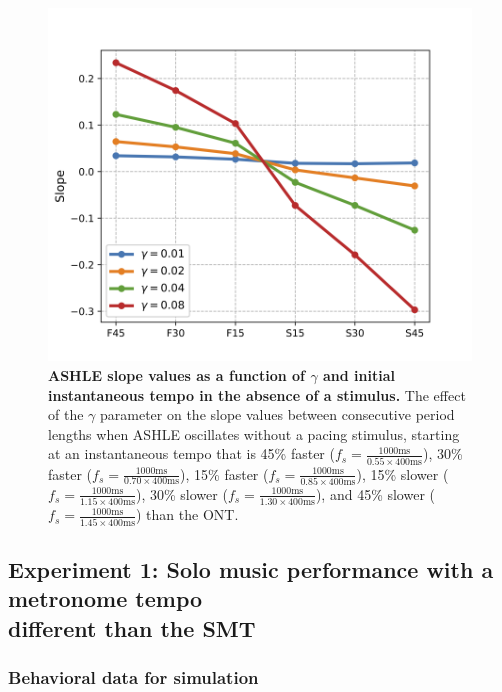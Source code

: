 \documentclass{report}
\begin{document}
\begin{figure}
    \centering
    \includegraphics[width=1.0\textwidth]{figures/fig3_8.png}
    \caption[ASHLE slope values as a function of $\gamma$ and initial instantaneous tempo in the absence of a stimulus]{\textbf{ASHLE slope values as a function of $\gamma$ and initial instantaneous tempo in the absence of a stimulus.} The effect of the $\gamma$ parameter on the slope values between consecutive period lengths when ASHLE oscillates without a pacing stimulus, starting at an instantaneous tempo that is 45\% faster ($f_s = \frac{1000\text{ms}}{0.55 \times 400\text{ms}}$), 30\% faster ($f_s = \frac{1000\text{ms}}{0.70 \times 400\text{ms}}$), 15\% faster ($f_s = \frac{1000\text{ms}}{0.85 \times 400\text{ms}}$), 15\% slower ($f_s = \frac{1000\text{ms}}{1.15 \times 400\text{ms}}$), 30\% slower ($f_s = \frac{1000\text{ms}}{1.30 \times 400\text{ms}}$), and 45\% slower ($f_s = \frac{1000\text{ms}}{1.45 \times 400\text{ms}}$) than the ONT.}
    \label{f3_8}
\end{figure}

\subsection{Experiment 1: Solo music performance with a metronome tempo \\ different than the SMT}

\subsubsection{Behavioral data for simulation}
\end{document}
